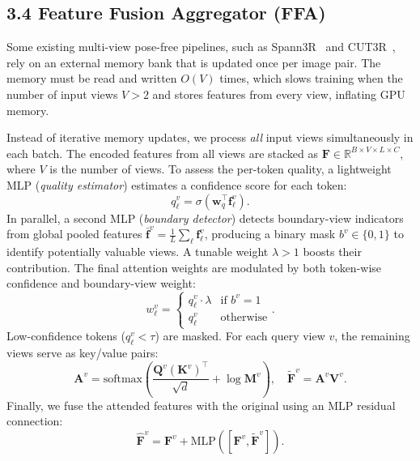 \documentclass[letterpaper]{article} %
\begin{document}
\subsection{3.4 Feature Fusion Aggregator (FFA)}
\label{sec:ffa}

Some existing multi-view pose-free pipelines, such as Spann3R~\cite{wang20243d} and CUT3R~\cite{wang2025continuous}, rely on an external memory bank that is updated once per image pair.
The memory must be read and written \(O(V)\) times, which slows training when the number of input views \(V>2\) and stores features from every view, inflating GPU memory.

Instead of iterative memory updates, we process \emph{all} input views simultaneously in each batch.
The encoded features from all views are stacked as
    $\mathbf{F} \in \mathbb{R}^{B \times V \times L \times C}$,
where $V$ is the number of views.
To assess the per-token quality, a lightweight MLP (\textit{quality estimator}) estimates a confidence score for each token:
\begin{equation}
    q^{v}_{\ell} = \sigma(\mathbf{w}_q^\top \mathbf{f}^{v}_{\ell}).
\end{equation}
In parallel, a second MLP (\textit{boundary detector}) detects boundary-view indicators from global pooled features $\bar{\mathbf{f}}^v = \frac{1}{L} \sum_{\ell} \mathbf{f}^v_\ell$, producing a binary mask $b^v \in \{0,1\}$ to identify potentially valuable views. A tunable weight $\lambda > 1$ boosts their contribution.
The final attention weights are modulated by both token-wise confidence and boundary-view weight:
\begin{equation}
    w^{v}_{\ell} = \begin{cases}
      q^v_\ell \cdot \lambda & \text{if } b^v = 1 \\
      q^v_\ell & \text{otherwise}
    \end{cases}.
\end{equation}
Low-confidence tokens ($q^v_\ell < \tau$) are masked. For each query view $v$, the remaining views serve as key/value pairs:
\begin{equation}
    \mathbf{A}^{v}= \mathrm{softmax}\!
      \left( \frac{\mathbf{Q}^{v}(\mathbf{K}^{v})^\top}{\sqrt{d}} 
             + \log \mathbf{M}^{v} \right),\quad
    \widetilde{\mathbf{F}}^{v}= \mathbf{A}^{v}\mathbf{V}^{v}.
\end{equation}
Finally, we fuse the attended features with the original using an MLP residual connection:
\begin{equation}
    \widehat{\mathbf{F}}^{v} = \mathbf{F}^{v} 
    + \mathrm{MLP}\left( \left[ \mathbf{F}^{v}, \widetilde{\mathbf{F}}^{v} \right] \right).
\end{equation}
\end{document}
